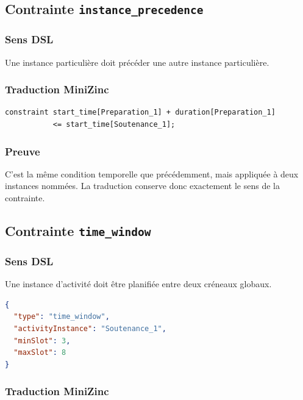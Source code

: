 \documentclass[12pt,a4paper]{article}
\begin{document}
\subsection{Contrainte \texttt{instance\_precedence}}

\subsubsection*{Sens DSL}

Une instance particulière doit précéder une autre instance particulière.

\subsubsection*{Traduction MiniZinc}

\begin{lstlisting}[language=MiniZinc]
constraint start_time[Preparation_1] + duration[Preparation_1]
           <= start_time[Soutenance_1];
\end{lstlisting}

\subsubsection*{Preuve}

C'est la même condition temporelle que précédemment, mais appliquée à deux instances nommées. La traduction conserve donc exactement le sens de la contrainte.

\subsection{Contrainte \texttt{time\_window}}

\subsubsection*{Sens DSL}

Une instance d'activité doit être planifiée entre deux créneaux globaux.

\begin{lstlisting}[language=JSON]
{
  "type": "time_window",
  "activityInstance": "Soutenance_1",
  "minSlot": 3,
  "maxSlot": 8
}
\end{lstlisting}

\subsubsection*{Traduction MiniZinc}
\end{document}
